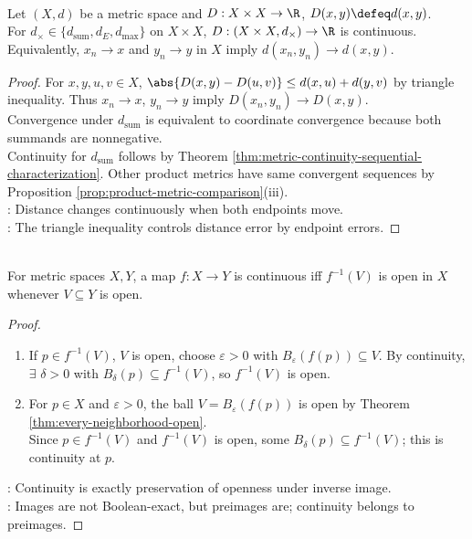 \begin{theorem} \label{thm:distance-function-is-continuous} \\
Let $(X,d)$ be a metric space and $D:X\times X\to\R$, $D(x,y)\defeq d(x,y)$.\\
For $d_\times\in\{d_{\mathrm{sum}},d_E,d_{\max}\}$ on $X\times X$, $D:(X\times X,d_\times)\to\R$ is continuous.\\
Equivalently, $x_n\to x$ and $y_n\to y$ in $X$ imply $d(x_n,y_n)\to d(x,y)$.
\begin{proof}
For $x,y,u,v\in X$, $\abs{D(x,y)-D(u,v)}\leq d(x,u)+d(y,v)$ by triangle inequality. Thus $x_n\to x$, $y_n\to y$ imply $D(x_n,y_n)\to D(x,y)$.\\
Convergence under $d_{\mathrm{sum}}$ is equivalent to coordinate convergence because both summands are nonnegative.\\
Continuity for $d_{\mathrm{sum}}$ follows by Theorem \ref{thm:metric-continuity-sequential-characterization}. Other product metrics have same convergent sequences by Proposition \ref{prop:product-metric-comparison}(iii).\\
: Distance changes continuously when both endpoints move.\\
: The triangle inequality controls distance error by endpoint errors.
\end{proof}
\end{theorem}

\begin{theorem} \label{thm:continuity-open-preimages} \\
For metric spaces $X,Y$, a map $f:X\to Y$ is continuous iff $f^{-1}(V)$ is open in $X$ whenever $V\subseteq Y$ is open.
\begin{proof}
\begin{enumerate}[label=\roman*.]
\setlength{\itemsep}{0pt}
\item[$(\Rightarrow)$] If $p\in f^{-1}(V)$, $V$ is open, choose $\varepsilon>0$ with $B_\varepsilon(f(p))\subseteq V$. By continuity, $\exists$ $\delta>0$ with $B_\delta(p)\subseteq f^{-1}(V)$, so $f^{-1}(V)$ is open.
\item[$(\Leftarrow)$] For $p\in X$ and $\varepsilon>0$, the ball $V=B_\varepsilon(f(p))$ is open by Theorem \ref{thm:every-neighborhood-open}.\\
Since $p\in f^{-1}(V)$ and $f^{-1}(V)$ is open, some $B_\delta(p)\subseteq f^{-1}(V)$; this is continuity at $p$.
\end{enumerate}
: Continuity is exactly preservation of openness under inverse image.\\
: Images are not Boolean-exact, but preimages are; continuity belongs to preimages.
\end{proof}
\end{theorem}

